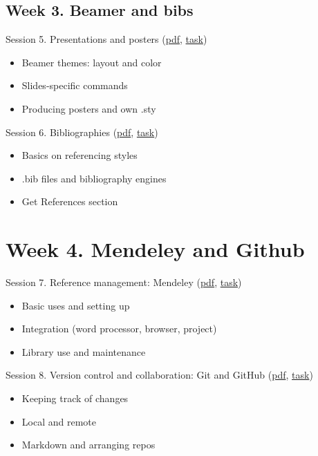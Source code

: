 \documentclass[a4paper,12pt]{article} %
\begin{document}
\subsection*{Week 3. Beamer and bibs}
	Session 5. Presentations and posters (\href{}{pdf}, \href{}{task})
	\begin{itemize}
		\item Beamer themes: layout and color
		\item Slides-specific commands
		\item Producing posters and own .sty 
	\end{itemize}

\newpage

	Session 6. Bibliographies (\href{}{pdf}, \href{}{task})
	\begin{itemize}
		\item Basics on referencing styles
		\item .bib files and bibliography engines
		\item Get References section
	\end{itemize}	

\section{{\color{red}Week 4. Mendeley and Github}}
	Session 7. Reference management: Mendeley (\href{}{pdf}, \href{}{task})
	\begin{itemize}
		\item Basic uses and setting up
		\item Integration (word processor, browser, project)
		\item Library use and maintenance 
	\end{itemize}%
	Session 8. Version control and collaboration: Git and GitHub (\href{}{pdf}, \href{}{task})
	\begin{itemize}
		\item Keeping track of changes
		\item Local and remote
		\item Markdown and arranging repos
	\end{itemize}
\end{document}
